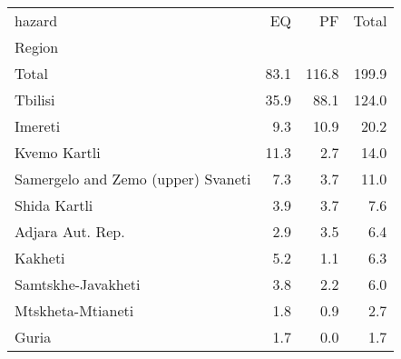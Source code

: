 \begin{tabular}{lrrr}
\toprule
hazard &    EQ &     PF &  Total \\
Region                             &       &        &        \\
\midrule
Total                              &  83.1 &  116.8 &  199.9 \\
Tbilisi                            &  35.9 &   88.1 &  124.0 \\
Imereti                            &   9.3 &   10.9 &   20.2 \\
Kvemo Kartli                       &  11.3 &    2.7 &   14.0 \\
Samergelo and Zemo (upper) Svaneti &   7.3 &    3.7 &   11.0 \\
Shida Kartli                       &   3.9 &    3.7 &    7.6 \\
Adjara Aut. Rep.                   &   2.9 &    3.5 &    6.4 \\
Kakheti                            &   5.2 &    1.1 &    6.3 \\
Samtskhe-Javakheti                 &   3.8 &    2.2 &    6.0 \\
Mtskheta-Mtianeti                  &   1.8 &    0.9 &    2.7 \\
Guria                              &   1.7 &    0.0 &    1.7 \\
\bottomrule
\end{tabular}
